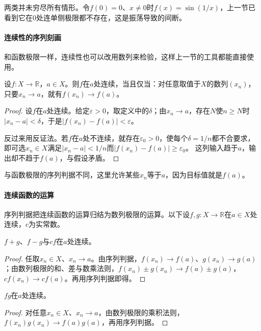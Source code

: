 两类并未穷尽所有情形。令$f(0)=0$、$x\neq0$时$f(x)=\sin(1/x)$，上一节已看到它在$0$处连单侧极限都不存在，这是振荡导致的间断。

\paragraph{连续性的序列刻画}
和函数极限一样，连续性也可以改用数列来检验，这样上一节的工具都能直接使用。
\begin{theorem}[连续性的序列判据]
\label{thm:ru-continuity-sequential}
设$f:X\to\mathbb R$，$a\in X$。则$f$在$a$处连续，当且仅当：对任意取值于$X$的数列$(x_n)$，只要$x_n\to a$，就有$f(x_n)\to f(a)$。
\end{theorem}
\begin{proof}
设$f$在$a$处连续。给定$\varepsilon>0$，取定义中的$\delta$；由$x_n\to a$，存在$N$使$n\geq N$时$|x_n-a|<\delta$，于是$|f(x_n)-f(a)|<\varepsilon$。

反过来用反证法。若$f$在$a$处不连续，就存在$\varepsilon_0>0$，使每个$\delta=1/n$都不合要求，即可选$x_n\in X$满足$|x_n-a|<1/n$而$|f(x_n)-f(a)|\geq\varepsilon_0$。
这列输入趋于$a$，输出却不趋于$f(a)$，与假设矛盾。
\end{proof}
与函数极限的序列判据不同，这里允许某些$x_n$等于$a$，因为目标值就是$f(a)$。

\paragraph{连续函数的运算}
序列判据把连续函数的运算归结为数列极限的运算。以下设$f,g:X\to\mathbb R$在$a\in X$处连续，$c$为实常数。

\begin{theorem}[和、差与数乘的连续性]
\label{thm:ru-continuity-linear}
$f+g$、$f-g$与$cf$在$a$处连续。
\end{theorem}
\begin{proof}
任取$x_n\in X$、$x_n\to a$。由序列判据，$f(x_n)\to f(a)$、$g(x_n)\to g(a)$；由数列极限的和、差与数乘法则，$f(x_n)\pm g(x_n)\to f(a)\pm g(a)$，$cf(x_n)\to cf(a)$。再用序列判据即得。
\end{proof}

\begin{theorem}[积的连续性]
\label{thm:ru-continuity-product}
$fg$在$a$处连续。
\end{theorem}
\begin{proof}
对任意$x_n\in X$、$x_n\to a$，由数列极限的乘积法则，$f(x_n)g(x_n)\to f(a)g(a)$，再用序列判据。
\end{proof}

